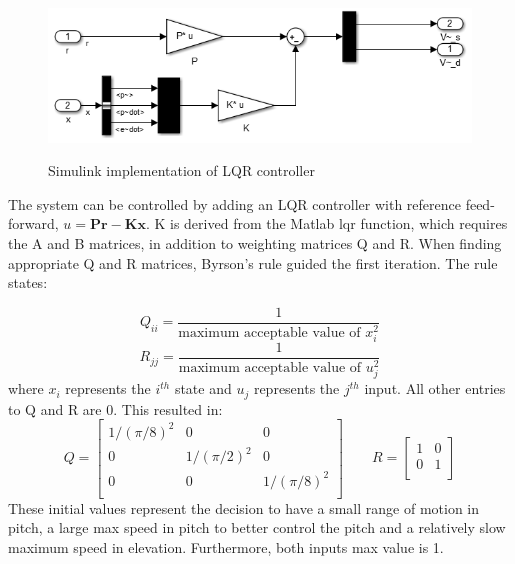 \begin{figure}[h]
\caption{Simulink implementation of LQR controller}
	\centering
		\includegraphics{images/LQRController.png}
	\label{fig:LQR controller}
\end{figure}

The system can be controlled by adding an LQR controller with reference
feed-forward, $u = \bm{Pr}-\bm{Kx}$. K is derived from the Matlab lqr
function, which requires the A and B matrices, in addition to
weighting matrices Q and R. When finding appropriate Q and R matrices,
Byrson's rule guided the first iteration. The rule states:

\begin{equation}
  Q_{ii} = \frac{1}{\text{maximum acceptable value of }x_i^2}
\end{equation}
\begin{equation}
  R_{jj} = \frac{1}{\text{maximum acceptable value of }u_j^2}
\end{equation}
where $x_i$ represents the $i^{th}$ state and $u_j$ represents the
$j^{th}$ input. All other entries to Q and R are 0. This resulted
in: \begin{equation}
  Q =
  \begin{bmatrix}
    1/(\pi/8)^2 & 0          & 0 \\
    0 &          1/(\pi/2)^2 & 0 \\
    0 &          0          & 1/(\pi/8)^2 \\
  \end{bmatrix}
  \qquad
  R =
  \begin{bmatrix}
    1 & 0 \\
    0 & 1 \\
  \end{bmatrix}
\end{equation}
These initial values represent the decision to have a small range of motion in
pitch, a large max speed in pitch to better control the pitch and a
relatively slow maximum speed in elevation. Furthermore, both inputs
max value is 1.

